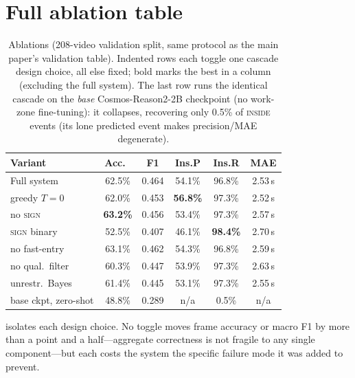 \documentclass[10pt,twocolumn,letterpaper]{article}
\begin{document}
\section{Full ablation table}
\label{supp:ablations}

\begin{table}[t]
\centering
\footnotesize
\setlength{\tabcolsep}{2.2pt}
\begin{tabular}{@{}lccccc@{}}
\toprule
Variant & Acc.\ & F1 & Ins.P & Ins.R & MAE \\
\midrule
Full system         & 62.5\% & 0.464 & 54.1\% & 96.8\% & 2.53\,s \\
\quad greedy $T{=}0$     & 62.0\% & 0.453 & \textbf{56.8\%} & 97.3\% & 2.52\,s \\
\quad no \textsc{sign}   & \textbf{63.2\%} & 0.456 & 53.4\% & 97.3\% & 2.57\,s \\
\quad \textsc{sign} binary & 52.5\% & 0.407 & 46.1\% & \textbf{98.4\%} & 2.70\,s \\
\quad no fast-entry  & 63.1\% & 0.462 & 54.3\% & 96.8\% & 2.59\,s \\
\quad no qual.\ filter & 60.3\% & 0.447 & 53.9\% & 97.3\% & 2.63\,s \\
\quad unrestr.\ Bayes & 61.4\% & 0.445 & 53.1\% & 97.3\% & 2.55\,s \\
\midrule
base ckpt, zero-shot & 48.8\% & 0.289 & n/a & 0.5\% & n/a \\
\bottomrule
\end{tabular}
\caption{Ablations (208-video validation split, same protocol as the main paper's validation table).  Indented rows each toggle one cascade design choice, all else fixed; bold marks the best in a column (excluding the full system). The last row runs the identical cascade on the \emph{base} Cosmos-Reason2-2B checkpoint (no work-zone fine-tuning): it collapses, recovering only 0.5\% of \textsc{inside} events (its lone predicted event makes precision/MAE degenerate).}
\label{supp:tab:ablations}
\end{table}

 isolates each design choice.  No toggle moves frame accuracy or macro F1 by more than a point and a half---aggregate correctness is not fragile to any single component---but each costs the system the specific failure mode it was added to prevent.
\end{document}
